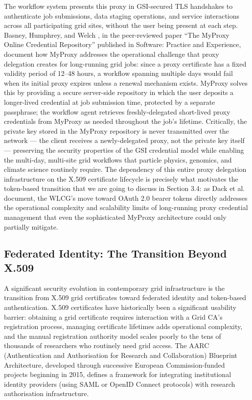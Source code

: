 \documentclass[12pt,a4paper]{report}
\begin{document}
    The workflow system presents this proxy in GSI-secured TLS handshakes
     to authenticate job submissions, data staging operations, and service interactions across all participating grid sites, without the user
      being present at each step. Basney, Humphrey, and Welch \parencite{basney2005myproxy}, in the peer-reviewed paper “The MyProxy Online Credential Repository” 
      published in Software: Practice and Experience, document how MyProxy addresses the operational challenge that proxy delegation creates 
      for long-running grid jobs: since a proxy certificate has a fixed validity period of 12–48 hours, a workflow spanning multiple days would 
      fail when its initial proxy expires unless a renewal mechanism exists. MyProxy solves this by providing a secure server-side repository in
       which the user deposits a longer-lived credential at job submission time, protected by a separate passphrase; the workflow agent retrieves 
       freshly-delegated short-lived proxy credentials from MyProxy as needed throughout the job’s lifetime. Critically, the private key stored in 
       the MyProxy repository is never transmitted over the network — the client receives a newly-delegated proxy, not the private key itself 
       — preserving the security properties of the GSI credential model while enabling the multi-day, multi-site grid workflows that particle physics,
        genomics, and climate science routinely require. The dependency of this entire proxy delegation infrastructure on the X.509 certificate 
        lifecycle is precisely what motivates the token-based transition that we are going to discuss in Section 3.4: as Dack et al. \parencite{dack2024wlcg} document, the WLCG’s move 
        toward OAuth 2.0 bearer tokens directly addresses the operational complexity and scalability limits of long-running proxy credential 
        management that even the sophisticated MyProxy architecture could only partially mitigate.

\subsection*{Federated Identity: The Transition Beyond X.509}
A significant security evolution in contemporary grid infrastructure is the transition from X.509 grid certificates toward federated identity 
and token-based authentication. X.509 certificates have historically been a significant usability barrier: obtaining a grid certificate requires 
interaction with a Grid CA’s registration process, managing certificate lifetimes adds operational complexity, and the manual registration authority
 model scales poorly to the tens of thousands of researchers who routinely need grid access. The AARC (Authentication and Authorisation for Research 
 and Collaboration) Blueprint Architecture, developed through successive European Commission-funded projects beginning in 2015, defines a framework 
 for integrating institutional identity providers (using SAML or OpenID Connect protocols) with research authorisation infrastructure. 
 
\end{document}
